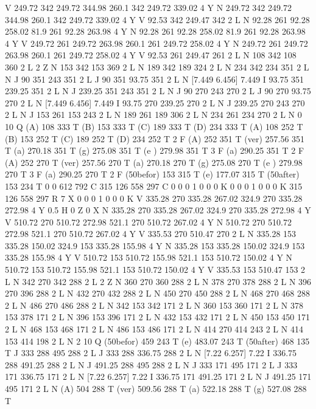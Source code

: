 V
249.72 342 249.72 344.98 260.1 342 249.72 339.02 4 Y
N
249.72 342 249.72 344.98 260.1 342 249.72 339.02 4 Y
V
92.53 342 249.47 342 2 L
N
92.28 261 92.28 258.02 81.9 261 92.28 263.98 4 Y
N
92.28 261 92.28 258.02 81.9 261 92.28 263.98 4 Y
V
249.72 261 249.72 263.98 260.1 261 249.72 258.02 4 Y
N
249.72 261 249.72 263.98 260.1 261 249.72 258.02 4 Y
V
92.53 261 249.47 261 2 L
N
108 342 108 360 2 L
2 Z
N
153 342 153 369 2 L
N
189 342 189 324 2 L
N
234 342 234 351 2 L
N
J
90 351 243 351 2 L
J
90 351 93.75 351 2 L
N
[7.449 6.456] 7.449 I
93.75 351 239.25 351 2 L
N
J
239.25 351 243 351 2 L
N
J
90 270 243 270 2 L
J
90 270 93.75 270 2 L
N
[7.449 6.456] 7.449 I
93.75 270 239.25 270 2 L
N
J
239.25 270 243 270 2 L
N
J
153 261 153 243 2 L
N
189 261 189 306 2 L
N
234 261 234 270 2 L
N
0 10 Q
(A) 108 333 T
(B) 153 333 T
(C) 189 333 T
(D) 234 333 T
(A) 108 252 T
(B) 153 252 T
(C) 189 252 T
(D) 234 252 T
2 F
(A) 252 351 T
(ver) 257.56 351 T
(a) 270.18 351 T
(g) 275.08 351 T
(e ) 279.98 351 T
3 F
(a) 290.25 351 T
2 F
(A) 252 270 T
(ver) 257.56 270 T
(a) 270.18 270 T
(g) 275.08 270 T
(e ) 279.98 270 T
3 F
(a) 290.25 270 T
2 F
(\050befor) 153 315 T
(e) 177.07 315 T
(\050after) 153 234 T
0 0 612 792 C
315 126 558 297 C
0 0 0 1 0 0 0 K
0 0 0 1 0 0 0 K
315 126 558 297 R
7 X
0 0 0 1 0 0 0 K
V
335.28 270 335.28 267.02 324.9 270 335.28 272.98 4 Y
0.5 H
0 Z
0 X
N
335.28 270 335.28 267.02 324.9 270 335.28 272.98 4 Y
V
510.72 270 510.72 272.98 521.1 270 510.72 267.02 4 Y
N
510.72 270 510.72 272.98 521.1 270 510.72 267.02 4 Y
V
335.53 270 510.47 270 2 L
N
335.28 153 335.28 150.02 324.9 153 335.28 155.98 4 Y
N
335.28 153 335.28 150.02 324.9 153 335.28 155.98 4 Y
V
510.72 153 510.72 155.98 521.1 153 510.72 150.02 4 Y
N
510.72 153 510.72 155.98 521.1 153 510.72 150.02 4 Y
V
335.53 153 510.47 153 2 L
N
342 270 342 288 2 L
2 Z
N
360 270 360 288 2 L
N
378 270 378 288 2 L
N
396 270 396 288 2 L
N
432 270 432 288 2 L
N
450 270 450 288 2 L
N
468 270 468 288 2 L
N
486 270 486 288 2 L
N
342 153 342 171 2 L
N
360 153 360 171 2 L
N
378 153 378 171 2 L
N
396 153 396 171 2 L
N
432 153 432 171 2 L
N
450 153 450 171 2 L
N
468 153 468 171 2 L
N
486 153 486 171 2 L
N
414 270 414 243 2 L
N
414 153 414 198 2 L
N
2 10 Q
(\050befor) 459 243 T
(e) 483.07 243 T
(\050after) 468 135 T
J
333 288 495 288 2 L
J
333 288 336.75 288 2 L
N
[7.22 6.257] 7.22 I
336.75 288 491.25 288 2 L
N
J
491.25 288 495 288 2 L
N
J
333 171 495 171 2 L
J
333 171 336.75 171 2 L
N
[7.22 6.257] 7.22 I
336.75 171 491.25 171 2 L
N
J
491.25 171 495 171 2 L
N
(A) 504 288 T
(ver) 509.56 288 T
(a) 522.18 288 T
(g) 527.08 288 T

